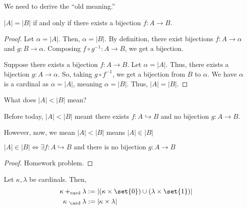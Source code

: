\documentclass[10pt]{mypackage}
\begin{document}
We need to derive the ``old meaning.'' 
\begin{theorem}
  $\left\vert A \right\vert = \left\vert B \right\vert$ if and only if there exists a bijection $f: A\rightarrow B$.
\end{theorem}
\begin{proof}
  Let $\alpha = \left\vert A \right\vert$. Then, $\alpha = \left\vert B \right\vert$. By definition, there exist bijections $f: A\rightarrow \alpha$ and $g: B\rightarrow \alpha$. Composing $f\circ g^{-1}: A\rightarrow B$, we get a bijection.\newline

  Suppose there exists a bijection $f: A\rightarrow B$. Let $\alpha = \left\vert A \right\vert$. Thus, there exists a bijection $g: A\rightarrow\alpha$. So, taking $g\circ f^{-1}$, we get a bijection from $B$ to $\alpha$. We have $\alpha$ is a cardinal as $\alpha = \left\vert A \right\vert$, meaning $\alpha = \left\vert B \right\vert$. Thus, $\left\vert A \right\vert = \left\vert B \right\vert$.
\end{proof}
\begin{question}
  What does $\left\vert A \right\vert < \left\vert B \right\vert$ mean?
  \begin{answer}
    Before today, $\left\vert A \right\vert < \left\vert B \right\vert$ meant there exists $f: A\hookrightarrow B$ and no bijection $g: A\rightarrow B$. 
  \end{answer}
\end{question}
However, now, we mean $\left\vert A \right\vert < \left\vert B \right\vert$ means $\left\vert A \right\vert \in \left\vert B \right\vert$
\begin{theorem}
    $\left\vert A \right\vert\in \left\vert B \right\vert \Leftrightarrow \exists f: A\hookrightarrow B\text{ and there is no bijection $g:A\rightarrow B$}$
\end{theorem}
\begin{proof}
  Homework problem.
\end{proof}
\begin{definition}
  Let $\kappa,\lambda$ be cardinals. Then, 
  \begin{align*}
    \kappa +_{\text{card}}\lambda &:= \left\vert \left(\kappa\times \set{0}\right)\cup \left(\lambda\times\set{1}\right) \right\vert\\
    \kappa \cdot_{\text{card}}\lambda &:= \left\vert \kappa\times\lambda \right\vert
  \end{align*}
\end{definition}
\end{document}
